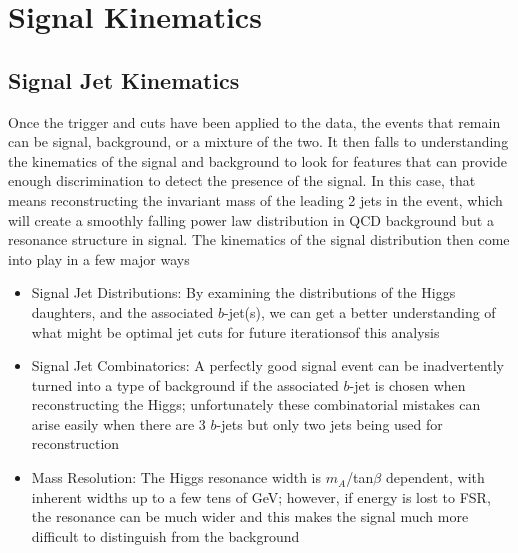  

\chapter[Signal Kinematics]{Signal Kinematics}
 
\section{Signal Jet Kinematics}

Once the trigger and cuts have been applied to the data, the events that remain can be signal, background, or a mixture of the two.  
It then falls to understanding the kinematics of the signal and background to look for features that can
provide enough discrimination to detect the presence of the signal.  In this case, that means reconstructing
the invariant mass of the leading 2 jets in the event, which will create a smoothly falling power
law distribution in QCD background but a resonance structure in signal.  The kinematics of the signal
distribution then come into play in a few major ways
\begin{itemize}
    \item Signal Jet \pt Distributions:  By examining the \pt distributions of the Higgs daughters, and the associated $b$-jet(s), we can get a better understanding of what might be optimal jet \pt cuts for future iterationsof this analysis 
    \item Signal Jet Combinatorics: A perfectly good signal event can be inadvertently turned into a type of background if the associated $b$-jet is chosen when reconstructing the Higgs; unfortunately these combinatorial mistakes can arise easily when there are 3 $b$-jets but only two jets being used for reconstruction
    \item Mass Resolution: The Higgs resonance width is $m_A$/tan$\beta$ dependent, with inherent widths
up to a few tens of GeV; however, if energy is lost to FSR, the resonance can be much wider and this makes
the signal much more difficult to distinguish from the background
\end{itemize}

